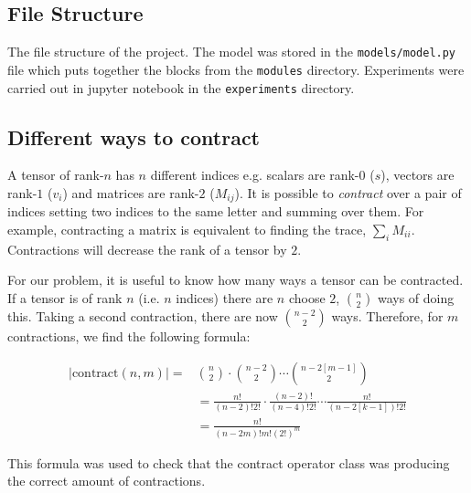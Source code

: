 \subsection{File Structure}

The file structure of the project. The model was stored in the \texttt{models/model.py} file which puts together the blocks from the \texttt{modules} directory. Experiments were carried out in jupyter notebook in the \texttt{experiments} directory. 


\subsection{Different ways to contract} \label{sec:proof}

A tensor of rank-$n$ has $n$ different indices e.g. scalars are rank-$0$ ($s$), vectors are rank-$1$ ($v_i$) and matrices are rank-$2$ ($M_{ij}$). It is possible to \textit{contract} over a pair of indices setting two indices to the same letter and summing over them. For example, contracting a matrix is equivalent to finding the trace, $\sum_i M_{ii}$. Contractions will decrease the rank of a tensor by $2$. 


For our problem, it is useful to know how many ways a tensor can be contracted. If a tensor is of rank $n$ (i.e. $n$ indices) there are $n$ choose $2$, $n \choose 2$ ways of doing this. Taking a second contraction, there are now $ {n-2} \choose 2$ ways. Therefore, for $m$ contractions, we find the following formula: 

\begin{align}
  |\mathrm{contract}(n,m)| = &{n \choose 2} \cdot {{n-2} \choose 2} \cdots {{n - 2[m-1]} \choose 2}  \\
       &= \frac{n!}{(n-2)!2!} \cdot \frac{(n-2)!}{(n-4)!2!} \cdots \frac{n!}{(n-2[k-1])!2!} \\
       &= \frac{n!}{(n-2m)! m! (2!)^m}
\end{align}


This formula was used to check that the contract operator class was producing the correct amount of contractions.

